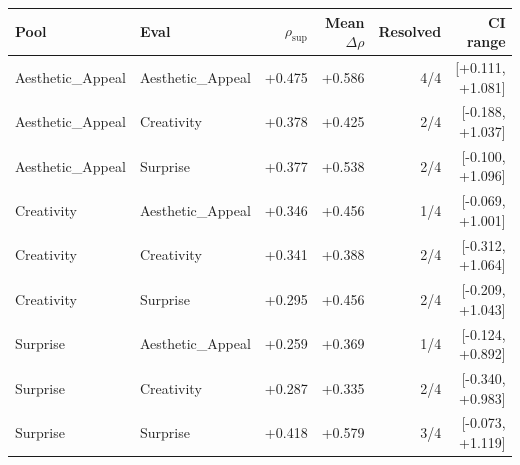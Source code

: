 \begin{tabular}{llrrrr}
\toprule
Pool & Eval & $\rho_{\mathrm{sup}}$ & Mean $\Delta\rho$ & Resolved & CI range \\
\midrule
Aesthetic\_Appeal & Aesthetic\_Appeal & +0.475 & +0.586 & 4/4 & [+0.111, +1.081] \\
Aesthetic\_Appeal & Creativity & +0.378 & +0.425 & 2/4 & [-0.188, +1.037] \\
Aesthetic\_Appeal & Surprise & +0.377 & +0.538 & 2/4 & [-0.100, +1.096] \\
Creativity & Aesthetic\_Appeal & +0.346 & +0.456 & 1/4 & [-0.069, +1.001] \\
Creativity & Creativity & +0.341 & +0.388 & 2/4 & [-0.312, +1.064] \\
Creativity & Surprise & +0.295 & +0.456 & 2/4 & [-0.209, +1.043] \\
Surprise & Aesthetic\_Appeal & +0.259 & +0.369 & 1/4 & [-0.124, +0.892] \\
Surprise & Creativity & +0.287 & +0.335 & 2/4 & [-0.340, +0.983] \\
Surprise & Surprise & +0.418 & +0.579 & 3/4 & [-0.073, +1.119] \\
\bottomrule
\end{tabular}

